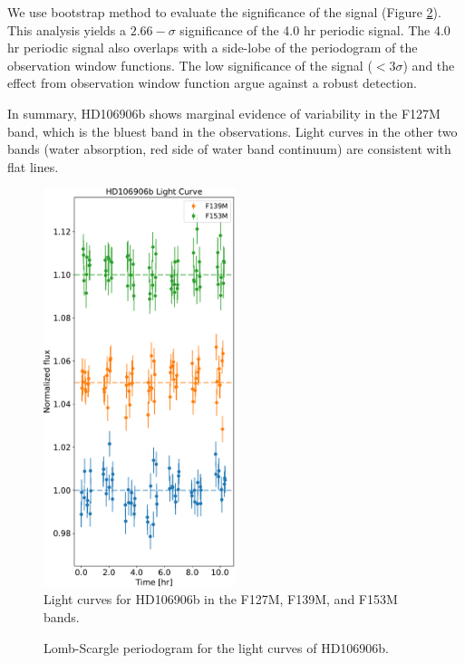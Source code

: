 \documentclass[twocolumn]{aastex62}
\begin{document}
We use bootstrap method\citep{Manjavacas2017,Zhou2019} to evaluate the significance of the signal (Figure \ref{fig:periodogram}). This analysis yields a $2.66-\sigma$ significance of the 4.0 hr periodic signal. The 4.0 hr periodic signal also overlaps with a side-lobe of the periodogram of the observation window functions. The low significance of the signal ($<3\sigma$) and the effect from observation window function argue against a robust detection.

In summary, HD106906b shows marginal evidence of variability in the F127M band, which is the bluest band in the observations. Light curves in the other two bands (water absorption, red side of water band continuum) are consistent with flat lines.

\begin{figure}
  \centering
  \includegraphics[width=0.5\textwidth]{figures/HD106906_lightcurves.pdf}
  \caption{Light curves for HD106906b in the F127M, F139M, and F153M bands.}
  \label{fig:lightcurve}
\end{figure}

\begin{figure}
  \centering
  \caption{Lomb-Scargle periodogram for the light curves of HD106906b. }
  \label{fig:periodogram}
\end{figure}
\end{document}
